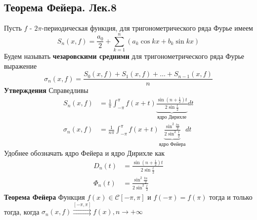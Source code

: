 \documentclass{article}
\begin{document}
\subsection{Теорема Фейера. Лек.8}
	Пусть $f$ - $2\pi$-периодическая функция, для тригонометрического ряда Фурье имеем
	\begin{equation}
	\label{2-5}
	{S}_{n}(x,f)=\frac{{a}_{0}}{2}+\sum_{k=1}^{n}({a}_{k}\cos kx+{b}_{k}\sin kx)
	\end{equation}
	Будем называть \textbf{чезаровскими средними} для тригонометрического ряда Фурье выражение
	\begin{equation}
	\label{2-6}
	{\sigma}_{n}(x,f)=\frac{{S}_{0}(x,f)+{S}_{1}(x,f)+\ldots+{S}_{n-1}(x,f)}{n}
	\end{equation}
	\textbf{Утверждения} Справедливы
	\begin{equation}
	\label{2-7}
	\begin{aligned}
	{S}_{n}(x,f)&=\frac{1}{\pi}\int_{-\pi}^{\pi} f(x+t)\underbrace{\frac{\sin(n+\frac{1}{2})t}{2\sin\frac{t}{2}}}_{\text{ядро Дирихле}}dt\\
	{\sigma}_{n}(x,f)&=\frac{1}{n\pi}\int_{-\pi}^{\pi} f(x+t)\underbrace{\frac{{\sin}^{2}\frac{tn}{2}}{2{\sin}^{2}\frac{t}{2}}}_{\text{ядро Фейера}}dt
	\end{aligned}
	\end{equation}
	Удобнее обозначать ядро Фейера и ядро Дирихле как
	\begin{equation}
	\label{2-8}
	\begin{aligned}
	{D}_{n}(t)&=\frac{\sin(n+\frac{1}{2})t}{2\sin\frac{t}{2}}\\
	{\Phi}_{n}(t)&=\frac{{\sin}^{2}\frac{tn}{2}}{2{\sin}^{2}\frac{t}{2}}
	\end{aligned}
	\end{equation}
	\textbf{Теорема Фейера} Функция $f(x)\in \mathcal{C}[-\pi,\pi]$ и $f(-\pi)=f(\pi)$ тогда и только тогда, когда ${\sigma}_{n}(x,f)\stackrel{[-\pi,\pi]}{\rightrightarrows}f(x), n\rightarrow+\infty$
\end{document}
